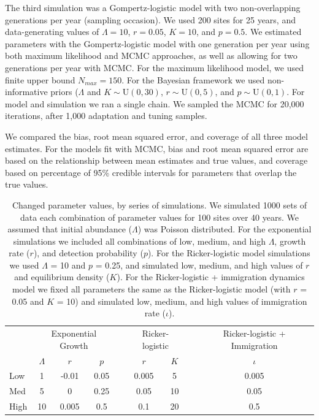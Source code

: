 \documentclass{article}
\begin{document}
The third simulation was a Gompertz-logistic model with two non-overlapping generations per year (sampling occasion).   
We used 200 sites for 25 years, and data-generating values of $\Lambda = 10$, $r = 0.05$, $K = 10$, and $p = 0.5$.
We estimated parameters with the Gompertz-logistic model with 
one generation per year using both maximum likelihood and MCMC approaches, as well
as allowing for two generations per year with MCMC.  
For the maximum likelihood model, we used finite upper bound $N_{max} = 150$. 
For the Bayesian framework we used non-informative priors ($\Lambda$ and $K  \sim \mathrm{U}(0, 30)$, $r  \sim \mathrm{U}(0, 5)$,
and $p  \sim \mathrm{U}(0, 1)$.  
For model and simulation we ran a single chain. We sampled the MCMC for 20,000 iterations, after 1,000 adaptation and tuning samples.  

We compared the bias, root mean
squared error, and coverage of all three model estimates.  For the models fit with MCMC,
bias and root mean squared error are based on the relationship between mean estimates
and true values, and coverage
based on percentage of 95\% credible intervals for parameters that overlap the true values.
\newpage

\begin{table}[t]
  \centering
\caption{Changed parameter values, by series of simulations.  We
simulated 1000 sets of data each combination of parameter values
for 100 sites over 40 years.  We assumed that initial abundance
($\Lambda$) was Poisson distributed.  For the exponential 
simulations we included all combinations of low, medium, and
high $\Lambda$, growth rate ($r$), and detection probability ($p$).
For the Ricker-logistic model simulations we used $\Lambda$ = 10 and $p$ = 0.25, and
simulated low, medium, and high values of $r$ and equilibrium density ($K$).
For the Ricker-logistic + immigration dynamics model we fixed all parameters the
same as the Ricker-logistic model (with $r$ = 0.05 and $K$ = 10) and
simulated low, medium, and high values of immigration rate ($\iota$).}  
\begin{tabular}{lcccccccc}
    \hline
    & \multicolumn{3}{c}{Exponential Growth} && \multicolumn{2}{c}{Ricker-logistic} &&
    Ricker-logistic + Immigration \\
    \cline{2-4}     \cline{6-7}    \cline{9-9}
& $\Lambda$ & $r$ & $p$ && $r$  & $K$ && $\iota$  \\    
\hline
    Low	        &1	&-0.01	&0.05	&&0.005	 &5	&&0.005  \\
    Med	        &5	&0	&0.25	&&0.05	&10	&&0.05   \\
    High		 &10 &0.005	&0.5	&&0.1	&20	&&0.5    \\
    \hline
  \end{tabular}
\end{table}
\end{document}
